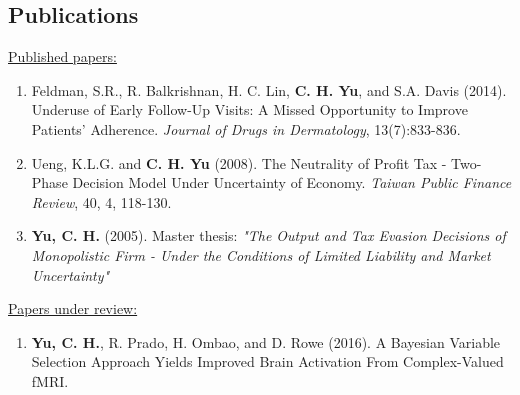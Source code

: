 \documentclass[]{res}
\begin{document}
\begin{resume}
 \section{Publications}

\underline{Published papers:}
\begin{enumerate}
	\item Feldman, S.R., R. Balkrishnan, H. C. Lin, \textbf{C. H. Yu}, and S.A. Davis (2014). Underuse of Early Follow-Up Visits: A Missed Opportunity to Improve Patients' Adherence. \textit{Journal of Drugs in Dermatology}, 13(7):833-836.
	\item Ueng, K.L.G. and \textbf{C. H. Yu} (2008). The Neutrality of Profit Tax - Two-Phase Decision Model Under Uncertainty of Economy. \textit{Taiwan Public Finance Review}, 40, 4, 118-130.
	\item \textbf{Yu, C. H.} (2005). Master thesis: \textit{"The Output and Tax Evasion Decisions of Monopolistic Firm - Under the Conditions of Limited Liability and Market Uncertainty"}
\end{enumerate}
% 

\underline{Papers under review:}
\begin{enumerate}
	\item \textbf{Yu, C. H.}, R. Prado, H. Ombao, and D. Rowe (2016). A Bayesian Variable Selection Approach Yields Improved Brain Activation From Complex-Valued fMRI. 
\end{enumerate}


\end{resume}
\end{document}
